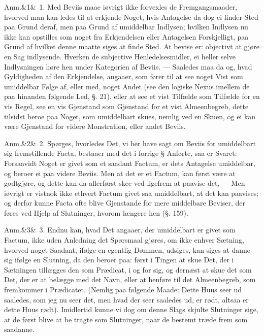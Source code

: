 \documentclass[12pt]{book}
\makeatletter
\def\sperr#1{#1}%
\def\textit#1{#1}%
\def\emph#1{#1}%
\newcommand{\sperr}[1]{\textls[180]{#1}}
\newcommand{\umph}[2][misc]{%
  \@ifundefined{umph@#1@on}{#2}{\emph{#2}}}
\newcommand{\anm}[1]{%
  \par\vspace{0.5\baselineskip}%
  \noindent\hspace{\parindent}\sperr{Anm.}\ifx&#1&\else~\textit{#1}.\fi
  \enspace\ignorespaces
}
\newcommand{\opage}[1]{\marginnote{\footnotesize\textit{[#1]}}}
\makeatother
\begin{document}
\anm{1} Med Beviis maae iøvrigt ikke forvexles de Fremgangsmaader, hvorved man kan
ledes til at erkjende Noget, hvis Antagelse da dog ei finder Sted paa Grund deraf, men
paa Grund af umiddelbar Indlysen; hvilken Indlysen nu ikke kan opstilles som noget fra
Erkjendelsen eller Antagelsen Forskjelligt, paa Grund af hvilket denne maatte siges at
finde Sted. At bevise er: \emph{objectivt at gjøre en Sag indlysende}. Hverken de subjective
Henledelsesmidler, ei heller selve Indlysningen høre hen under Kategorien af Beviis.
--- Saaledes maa da og, hvad Gyldigheden af den Erkjendelse, angaaer, som fører til at
see noget Vist som umiddelbar Følge af, eller med, noget Andet (see den logiske Nexus
imellem de paa hinanden følgende Led, §. 21), eller at see et vist Tilfælde som
Tilfælde for en vis Regel, see en vis Gjenstand som Gjenstand for et vist
Almeenbegreb, dette tilsidst beroe paa Noget, som umiddelbart skues, nemlig ved en
\umph[schwab]{intellectuel} Skuen, og ei kan være Gjenstand for videre Monstration,
eller andet Beviis.
\opage{322} \anm{2} Spørges, hvorledes Det, vi her have sagt om Beviis for umiddelbart sig
fremstillende Facta, bestaaer med det i forrige § Anførte, saa er Svaret: Forsaavidt
Noget er givet som et saadant Factum, er dets Antagelse umiddelbar, og beroer ei paa
videre Beviis. Men at det er et Factum, kan først være at godtgjøre, og dette kan da
allerførst skee ved ligefrem at paavise det, --- Men iøvrigt er vistnok ikke ethvert
Factum givet saa umiddelbart, at det kan paavises; og derfor kunne Facta ofte blive
Gjenstande for mere middelbare Beviser, der føres ved Hjelp af Slutninger, hvorom
længere hen (§. 159).

\anm{3} Endnu kan, hvad Det angaaer, der umiddelbart er givet som Factum, ikke uden
Anledning det Spørsmaal gjøres, om ikke enhver Sætning, hvorved noget Saadant, ifølge
en egentlig Dømmen, udsiges, kan siges at danne sig ifølge en Slutning, da den beroer
paa: først i Tingen at skue Det, der i Sætningen tillægges den som Prædicat, i og for
sig, og dernæst at skue det som Det, der er at belægge med det Navn, eller at henføre
til det Almeenbegreb, som fremkommer i Prædicatet. (Nemlig paa følgende Maade: Dette
Huus seer ud saaledes, som jeg nu seer det, men hvad der seer saaledes ud, er rødt,
altsaa er dette Huus rødt). Imidlertid kunne vi dog om denne Slags skjulte Slutninger
sige, at de først blive at be%
\opage{323}tragte som Slutninger, naar de bestemt træde frem som saadanne.
\end{document}
